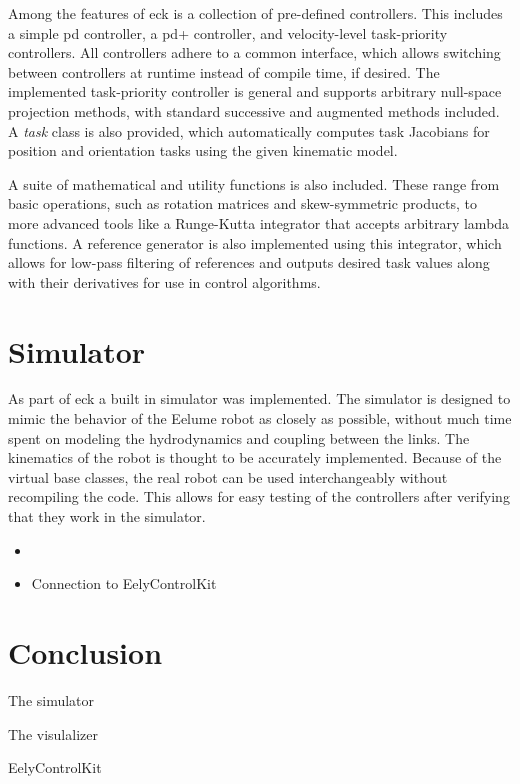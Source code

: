 Among the features of \gls{eck} is a collection of pre-defined controllers. This includes a simple \gls{pd} controller, a \gls{pd+} controller, and velocity-level task-priority controllers. All controllers adhere to a common interface, which allows switching between controllers at runtime instead of compile time, if desired. The implemented task-priority controller is general and supports arbitrary null-space projection methods, with standard successive and augmented methods included. A \textit{task} class is also provided, which automatically computes task Jacobians for position and orientation tasks using the given kinematic model.

A suite of mathematical and utility functions is also included. These range from basic operations, such as rotation matrices and skew-symmetric products, to more advanced tools like a Runge-Kutta integrator that accepts arbitrary lambda functions. A reference generator is also implemented using this integrator, which allows for low-pass filtering of references and outputs desired task values along with their derivatives for use in control algorithms.

\section{Simulator}

As part of \gls{eck} a built in simulator was implemented. 
The simulator is designed to mimic the behavior of the Eelume robot as closely
as possible, 
without much time spent on modeling the hydrodynamics and coupling
between the links.
The kinematics of the robot is thought to be accurately
implemented. Because of the virtual base classes, the real robot can be used
interchangeably without recompiling the code. This allows for easy testing of
the controllers after verifying that they work in the simulator.

\begin{itemize}
    \item 
\end{itemize}


\begin{itemize}
    \item Connection to EelyControlKit
\end{itemize}

\section{Conclusion}

The simulator

The visulalizer

EelyControlKit

